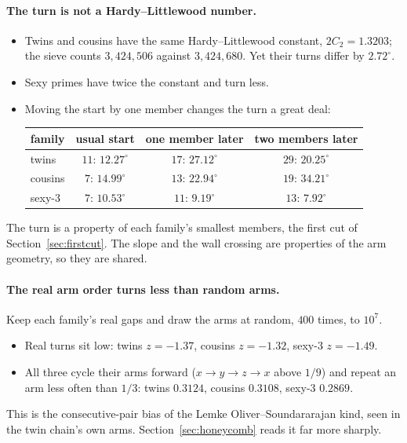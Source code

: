 \paragraph{The turn is not a Hardy--Littlewood number.} 
\begin{itemize}
\item Twins and cousins have the same Hardy--Littlewood constant, $2C_2=1.3203$; the sieve counts $3{,}424{,}506$ against $3{,}424{,}680$. Yet their turns differ by $2.72^\circ$.
\item Sexy primes have twice the constant and turn less.
\item Moving the start by one member changes the turn a great deal:

\begin{center}\begin{tabular}{lccc}
\toprule
family & usual start & one member later & two members later\\
\midrule
twins & $11$: $12.27^\circ$ & $17$: $27.12^\circ$ & $29$: $20.25^\circ$\\
cousins & $7$: $14.99^\circ$ & $13$: $22.94^\circ$ & $19$: $34.21^\circ$\\
sexy-3 & $7$: $10.53^\circ$ & $11$: $9.19^\circ$ & $13$: $7.92^\circ$\\
\bottomrule
\end{tabular}\end{center}
\end{itemize}
The turn is a property of each family's smallest members, the first cut of Section~\ref{sec:firstcut}. The slope and the wall crossing are properties of the arm geometry, so they are shared.

\paragraph{The real arm order turns less than random arms.} 
Keep each family's real gaps and draw the arms at random, $400$ times, to $10^7$.
\begin{itemize}
\item Real turns sit low: twins $z=-1.37$, cousins $z=-1.32$, sexy-3 $z=-1.49$.
\item All three cycle their arms forward ($x\to y\to z\to x$ above $1/9$) and repeat an arm less often than $1/3$: twins $0.3124$, cousins $0.3108$, sexy-3 $0.2869$.
\end{itemize}
This is the consecutive-pair bias of the Lemke Oliver--Soundararajan kind, seen in the twin chain's own arms. Section~\ref{sec:honeycomb} reads it far more sharply.

